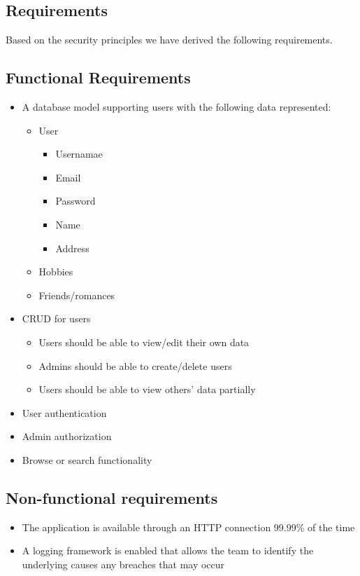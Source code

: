 \documentclass[a4paper]{article}
\begin{document}
\subsection{Requirements}
Based on the security principles we have derived the following requirements.

\subsection{Functional Requirements}
\begin{itemize}
\item A database model supporting users with the following data represented:
  \begin{itemize}
  \item User
      \begin{itemize}
      \item Usernamae
      \item Email
      \item Password
      \item Name
      \item Address
      \end{itemize}
  \item Hobbies
  \item Friends/romances
  \end{itemize}
\item CRUD for users
	\begin{itemize}
    \item Users should be able to view/edit their own data
    \item Admins should be able to create/delete users
    \item Users should be able to view others' data partially
    \end{itemize}
\item User authentication
\item Admin authorization
\item Browse or search functionality
\end{itemize}

\subsection{Non-functional requirements}
\begin{itemize}
\item The application is available through an HTTP connection 99.99\% of the time
\item A logging framework is enabled that allows the team to identify the underlying causes any breaches that may occur
\end{itemize}
\end{document}
